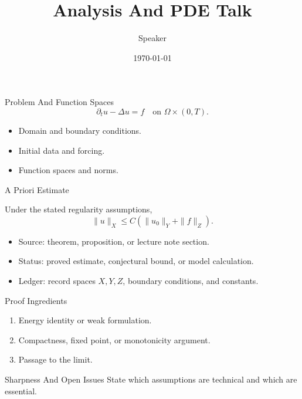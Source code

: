 \documentclass[10pt,aspectratio=169]{beamer}
\title{Analysis And PDE Talk}
\author{Speaker}
\date{\today}
\begin{document}
\begin{frame}\titlepage\end{frame}

\begin{frame}{Problem And Function Spaces}
  \[
    \partial_t u - \Delta u = f
    \quad \text{on } \Omega \times (0,T).
  \]
  \begin{itemize}
    \item Domain and boundary conditions.
    \item Initial data and forcing.
    \item Function spaces and norms.
  \end{itemize}
\end{frame}

\begin{frame}{A Priori Estimate}
  \begin{theorem}
    Under the stated regularity assumptions,
    \[
      \|u\|_{X} \le C\left(\|u_0\|_{Y}+\|f\|_{Z}\right).
    \]
  \end{theorem}
  \begin{itemize}
    \item Source: theorem, proposition, or lecture note section.
    \item Status: proved estimate, conjectural bound, or model calculation.
    \item Ledger: record spaces \(X,Y,Z\), boundary conditions, and constants.
  \end{itemize}
\end{frame}

\begin{frame}{Proof Ingredients}
  \begin{enumerate}
    \item Energy identity or weak formulation.
    \item Compactness, fixed point, or monotonicity argument.
    \item Passage to the limit.
  \end{enumerate}
\end{frame}

\begin{frame}{Sharpness And Open Issues}
  State which assumptions are technical and which are essential.
\end{frame}
\end{document}
